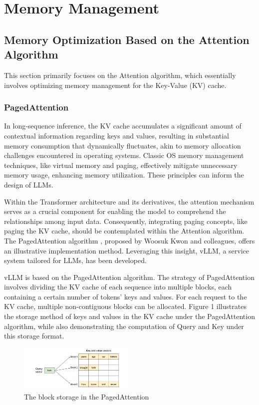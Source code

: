 \documentclass[conference]{IEEEtran}
\begin{document}
\section{Memory Management}
\subsection{Memory Optimization Based on the Attention Algorithm}
This section primarily focuses on the Attention algorithm, which essentially involves optimizing memory management for the Key-Value (KV) cache.
\subsubsection{PagedAttention}
In long-sequence inference, the KV cache accumulates a significant amount of contextual information regarding keys and values, resulting in substantial memory consumption that dynamically fluctuates, akin to memory allocation challenges encountered in operating systems. Classic OS memory management techniques, like virtual memory and paging, effectively mitigate unnecessary memory usage, enhancing memory utilization. These principles can inform the design of LLMs.

Within the Transformer architecture and its derivatives, the attention mechanism serves as a crucial component for enabling the model to comprehend the relationships among input data. Consequently, integrating paging concepts, like paging the KV cache, should be contemplated within the Attention algorithm. The PagedAttention algorithm \cite{b1}, proposed by Woosuk Kwon and colleagues, offers an illustrative implementation method. Leveraging this insight, vLLM, a service system tailored for LLMs, has been developed.

vLLM is based on the PagedAttention algorithm. The strategy of PagedAttention involves dividing the KV cache of each sequence into multiple blocks, each containing a certain number of tokens' keys and values. For each request to the KV cache, multiple non-contiguous blocks can be allocated. Figure 1 illustrates the storage method of keys and values in the KV cache under the PagedAttention algorithm, while also demonstrating the computation of Query and Key under this storage format.

\begin{figure}[htbp]
    \centerline{\includegraphics[width=0.5\textwidth]{process figM1.png}}
    \caption{The block storage in the PagedAttention \cite{b1}}
    \label{fig}
\end{figure}
\end{document}
